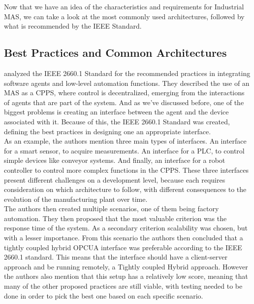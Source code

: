 Now that we have an idea of the characteristics and requirements for Industrial \gls{MAS}, we can take a look at the most commonly used architectures, followed by what is recommended by the IEEE Standard.

\subsection{Best Practices and Common Architectures}
\label{subsec:best_practices_and_common_architectures}

\citeauthor{Leitao2021} \cite{Leitao2021} analyzed the IEEE 2660.1 Standard for the recommended practices in integrating software agents and low-level automation functions. They described the use of an \gls{MAS} as a \gls{CPPS}, where control is decentralized, emerging from the interactions of agents that are part of the system. And as we've discussed before, one of the biggest problems is creating an interface between the agent and the device associated with it. Because of this, the IEEE 2660.1 Standard was created, defining the best practices in designing one an appropriate interface.\\

As an example, the authors mention three main types of interfaces. An interface for a smart sensor, to acquire measurements. An interface for a \gls{PLC}, to control simple devices like conveyor systems. And finally, an interface for a robot controller to control more complex functions in the \gls{CPPS}. These three interfaces present different challenges on a development level, because each requires consideration on which architecture to follow, with different consequences to the evolution of the manufacturing plant over time.\\

The authors then created multiple scenarios, one of them being factory automation. They then proposed that the most valuable criterion was the response time of the system. As a secondary criterion scalability was chosen, but with a lesser importance. From this scenario the authors then concluded that a tightly coupled hybrid \gls{OPCUA} interface was preferable according to the IEEE 2660.1 standard. This means that the interface should have a client-server approach and be running remotely, a Tightly coupled Hybrid approach. However the authors also mention that this setup has a relatively low score, meaning that many of the other proposed practices are still viable, with testing needed to be done in order to pick the best one based on each specific scenario.\\


